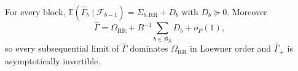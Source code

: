 For every block, \(\mathbb E(\widehat\Gamma_b\mid\mathcal F_{b-1})=\Sigma_{b,\mathrm{RR}}+D_b\) with \(D_b\succeq0\). Moreover \[\widehat\Gamma=\Omega_{\mathrm{RR}}+B^{-1}\sum_{b\in\mathcal B_B}D_b+o_P(1),\] so every subsequential limit of \(\widehat\Gamma\) dominates \(\Omega_{\mathrm{RR}}\) in Loewner order and \(\widehat\Gamma_+\) is asymptotically invertible.